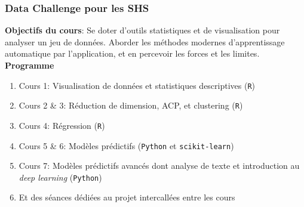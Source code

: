 \documentclass[10pt]{beamer}
\begin{document}
%
%
%







\frame
{ \frametitle{Data Challenge pour les SHS}
\vfill
\vspace{0.1cm }
\textbf{Objectifs du cours}: Se doter d'outils statistiques et de visualisation pour analyser un jeu de données. Aborder les méthodes modernes d'apprentissage automatique par l'application, et en percevoir les forces et les limites.\\
\vspace{0.1cm }
\pause
\textbf{Programme}
\begin{enumerate}
\item Cours 1: Visualisation de données et statistiques descriptives (\texttt{R})
\item Cours 2 \& 3: Réduction de dimension, ACP, et clustering (\texttt{R})
\item Cours 4: Régression (\texttt{R})
\item Cours 5 \& 6: Modèles prédictifs (\texttt{Python} et \texttt{scikit-learn})
\item Cours 7: Modèles prédictifs avancés dont analyse de texte et introduction au \textit{deep learning} (\texttt{Python})
\item Et des séances dédiées au projet intercallées entre les cours
\end{enumerate}

\vfill
}
\end{document}
